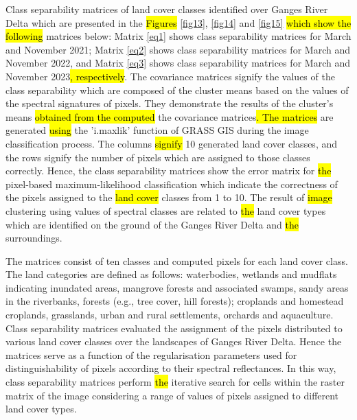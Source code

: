 \documentclass[water,article,submit,pdftex,moreauthors]{Definitions/mdpi}
\begin{document}
Class separability matrices of land cover classes identified over Ganges River Delta which are presented in the \hl{Figures }\ref{fig13}, \ref{fig14} and \ref{fig15} \hl{which show the following} matrices below: Matrix \ref{eq1} shows class separability matrices for March and November 2021; Matrix \ref{eq2} shows class separability matrices for March and November 2022, and Matrix \ref{eq3} shows class separability matrices for March and November 2023\hl{, respectively}. The covariance matrices signify the values of the class separability which are composed of the cluster means based on the values of the spectral signatures of pixels. They demonstrate the results of the cluster's means \hl{obtained from the computed} the covariance matrices\hl{. The matrices} are generated \hl{using} the 'i.maxlik' function of GRASS GIS during the image classification process. The columns \hl{signify} 10 generated land cover classes, and the rows signify the number of pixels which are assigned to those classes correctly. Hence, the class separability matrices show the error matrix for \hl{the} pixel-based maximum-likelihood classification which indicate the correctness of the pixels assigned to the \hl{land cover }classes from 1 to 10. The result of \hl{image} clustering\hl{ }using values of spectral classes are related to \hl{the} land cover types which are identified on the ground of the Ganges River Delta and \hl{the} surroundings. 

The matrices consist of ten classes and computed pixels for each land cover class. The land categories are defined as follows: waterbodies, wetlands and mudflats indicating inundated areas, mangrove forests and associated swamps, sandy areas in the riverbanks, forests (e.g., tree cover, hill forests); croplands and homestead croplands, grasslands, urban and rural settlements, orchards and aquaculture. Class separability matrices evaluated the assignment of the pixels distributed to various land cover classes over the landscapes of Ganges River Delta. Hence the matrices serve as a function of the regularisation parameters used for distinguishability of pixels according to their spectral reflectances. In this way, class separability matrices perform \hl{the} iterative search for cells within the raster matrix of the image considering a range of values of pixels assigned to different land cover types.
\end{document}
